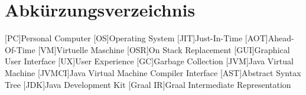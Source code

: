 \chapter*{Abkürzungsverzeichnis}
\begin{acronym}
    [PC]{Personal Computer}
    [OS]{Operating System}
    [JIT]{Just-In-Time}
    [AOT]{Ahead-Of-Time}
    [VM]{Virtuelle Maschine}
    [OSR]{On Stack Replacement}
    [GUI]{Graphical User Interface}
    [UX]{User Experience}
    [GC]{Garbage Collection}
    [JVM]{Java Virtual Machine}
    [JVMCI]{Java Virtual Machine Compiler Interface}    
    [AST]{Abstract Syntax Tree}
    [JDK]{Java Development Kit}
    [Graal IR]{Graal Intermediate Representation}
\end{acronym}